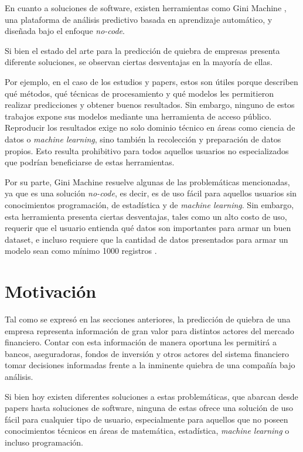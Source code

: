 En cuanto a soluciones de software, existen herramientas como Gini Machine \citep{WEBSITE:gini-machine}, una plataforma de análisis predictivo basada en aprendizaje automático, y diseñada bajo el enfoque \textit{no-code}.

Si bien el estado del arte para la predicción de quiebra de empresas presenta diferente soluciones, se observan ciertas desventajas en la mayoría de ellas.

Por ejemplo, en el caso de los estudios y papers, estos son útiles porque describen qué métodos, qué técnicas de procesamiento y qué modelos les permitieron realizar predicciones y obtener buenos resultados. Sin embargo, ninguno de estos trabajos expone sus modelos mediante una herramienta de acceso público. Reproducir los resultados exige no solo dominio técnico en áreas como ciencia de datos o \textit{machine learning}, sino también la recolección y preparación de datos propios. Esto resulta prohibitivo para todos aquellos usuarios no especializados que podrían beneficiarse de estas herramientas.

Por su parte, Gini Machine resuelve algunas de las problemáticas mencionadas, ya que es una solución \textit{no-code}, es decir, es de uso fácil para aquellos usuarios sin conocimientos programación, de estadística y de \textit{machine learning}. Sin embargo, esta herramienta presenta ciertas desventajas, tales como un alto costo de uso, requerir que el usuario entienda qué datos son importantes para armar un buen dataset, e incluso requiere que la cantidad de datos presentados para armar un modelo sean como mínimo 1000 registros \citep{WEBSITE:ai-4-that-gini-machine}.


\section{Motivación}

Tal como se expresó en las secciones anteriores, la predicción de quiebra de una empresa representa información de gran valor para distintos actores del mercado financiero. Contar con esta información de manera oportuna les permitirá a bancos, aseguradoras, fondos de inversión y otros actores del sistema financiero tomar decisiones informadas frente a la inminente quiebra de una compañía bajo análisis.

Si bien hoy existen diferentes soluciones a estas problemáticas, que abarcan desde papers hasta soluciones de software, ninguna de estas ofrece una solución de uso fácil para cualquier tipo de usuario, especialmente para aquellos que no poseen conocimientos técnicos en áreas de matemática, estadística, \textit{machine learning} o incluso programación.


